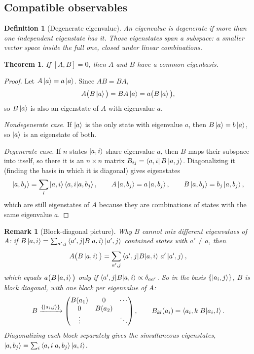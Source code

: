 \documentclass{article}
\newtheorem{theorem}{Theorem}
\newtheorem{definition}{Definition}
\newtheorem{remark}{Remark}
\begin{document}
\subsection{Compatible observables}
\begin{definition}[Degenerate eigenvalue]
    An eigenvalue is degenerate if more than one independent eigenstate has it. Those eigenstates span a \emph{subspace}: a smaller vector space inside the full one, closed under linear combinations.
\end{definition}
\begin{theorem}
    If $[A,B] = 0$, then $A$ and $B$ have a common eigenbasis.
\end{theorem}
\begin{proof}
    Let $A\ket{a} = a\ket{a}$. Since $AB = BA$,
    \[A\big(B\ket{a}\big) = BA\ket{a} = a\big(B\ket{a}\big),\]
    so $B\ket{a}$ is also an eigenstate of $A$ with eigenvalue $a$.\par
    \emph{Nondegenerate case.} If $\ket{a}$ is the only state with eigenvalue $a$, then $B\ket{a} = b\ket{a}$, so $\ket{a}$ is an eigenstate of both.\par
    \emph{Degenerate case.} If $n$ states $\ket{a,i}$ share eigenvalue $a$, then $B$ maps their subspace into itself, so there it is an $n\times n$ matrix $B_{ij} = \bra{a,i}B\ket{a,j}$. Diagonalizing it (finding the basis in which it is diagonal) gives eigenstates
    \[\ket{a,b_j} = \sum_{i}\ket{a,i}\braket{a,i|a,b_j}, \qquad A\ket{a,b_j} = a\ket{a,b_j}, \qquad B\ket{a,b_j} = b_j\ket{a,b_j},\]
    which are still eigenstates of $A$ because they are combinations of states with the same eigenvalue $a$.
\end{proof}
\begin{remark}[Block-diagonal picture]
    Why $B$ cannot mix different eigenvalues of $A$: if $B\ket{a,i} = \sum_{a',j}\braket{a',j|B|a,i}\ket{a',j}$ contained states with $a' \neq a$, then
    \[A\big(B\ket{a,i}\big) = \sum_{a',j}\braket{a',j|B|a,i}\,a'\ket{a',j},\]
    which equals $a\big(B\ket{a,i}\big)$ only if $\braket{a',j|B|a,i} \propto \delta_{aa'}$. So in the basis $\{\ket{a_i,j}\}$, $B$ is block diagonal, with one block per eigenvalue of $A$:
    \[B \xrightarrow{\{\ket{a_i,j}\}} \begin{pmatrix} B(a_1) & 0 & \cdots \\ 0 & B(a_2) & \\ \vdots & & \ddots \end{pmatrix}, \qquad B_{kl}(a_i) = \braket{a_i,k|B|a_i,l}.\]
    Diagonalizing each block separately gives the simultaneous eigenstates, $\ket{a,b_j} = \sum_i\braket{a,i|a,b_j}\ket{a,i}$.
\end{remark}
\end{document}
